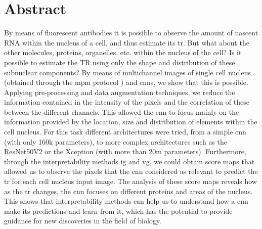 

\glsresetall


\section*{Abstract}

By means of fluorescent antibodies it is possible to observe the amount of nascent RNA within the nucleus of a cell, and thus estimate its \gls{tr}. But what about the other molecules, proteins, organelles, etc. within the nucleus of the cell? Is it possible to estimate the TR using only the shape and distribution of these subnuclear components? By means of multichannel images of single cell nucleus (obtained through the \gls{mpm} protocol \cite{Guteaar7042}) and \glspl{cnn}, we show that this is possible. 
Applying pre-processing and data augmentation techniques, we reduce the information contained in the intensity of the pixels and the correlation of these between the different channels. This allowed the \gls{cnn} to focus mainly on the information provided by the location, size and distribution of elements within the cell nucleus.
For this task different architectures were tried, from a simple \gls{cnn} (with only 160k parameters), to more complex architectures such as the ResNet50V2 or the Xception (with more than 20m parameters).
Furthermore, through the interpretability methods \gls{ig} and \gls{vg}, we could obtain score maps that allowed us to observe the pixels that the \gls{cnn} considered as relevant to predict the \gls{tr} for each cell nucleus input image. The analysis of these score maps reveals how as the \gls{tr} changes, the \gls{cnn} focuses on different proteins and areas of the nucleus. This shows that interpretability methods can help us to understand how a \gls{cnn} make its predictions and learn from it, which has the potential to provide guidance for new discoveries in the field of biology.
